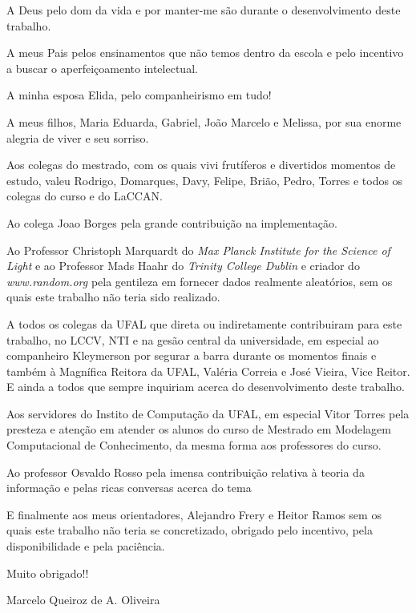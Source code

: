 \documentclass[tcc]{ic}
\begin{document}
\begin{agradecimentos}
\noindent

A Deus pelo dom da vida e por manter-me são durante o desenvolvimento deste trabalho.

A meus Pais pelos ensinamentos que não temos dentro da escola e pelo incentivo a buscar o aperfeiçoamento intelectual.

A minha esposa Elida, pelo companheirismo em tudo!

A meus filhos, Maria Eduarda, Gabriel, João Marcelo e Melissa, por sua enorme alegria de viver e seu sorriso.

Aos colegas do mestrado, com os quais vivi frutíferos e divertidos momentos de estudo, valeu Rodrigo, Domarques, Davy, 
Felipe, Brião, Pedro, Torres e todos os colegas do curso e do LaCCAN.

Ao colega Joao Borges pela grande contribuição na implementação.

Ao Professor Christoph Marquardt do \textit{Max Planck Institute for the Science of Light} e ao Professor Mads Haahr do \textit{Trinity College Dublin} e criador do \textit{www.random.org} pela gentileza em fornecer dados realmente aleatórios, sem os quais este trabalho não teria sido realizado.

A todos os colegas da UFAL que direta ou indiretamente contribuiram para este trabalho, no LCCV, NTI e na gesão central da universidade, em especial ao companheiro Kleymerson por segurar a barra durante os momentos finais e também à Magnífica Reitora da UFAL, Valéria Correia e José Vieira, Vice Reitor. E ainda a todos que sempre inquiriam acerca do desenvolvimento deste trabalho.

Aos servidores do Instito de Computação da UFAL, em especial Vitor Torres pela presteza e atenção em atender os alunos do curso de Mestrado em Modelagem Computacional de Conhecimento, da mesma forma aos professores do curso.

Ao professor Osvaldo Rosso pela imensa contribuição relativa à teoria da informação e pelas ricas conversas acerca do tema

E finalmente aos meus orientadores, Alejandro Frery e Heitor Ramos sem os quais este trabalho não teria se concretizado, obrigado pelo incentivo, pela disponibilidade e pela paciência. 

Muito obrigado!!

\vspace{1em}
\begin{flushright}
Marcelo Queiroz de A. Oliveira
\end{flushright}
\end{agradecimentos}
\end{document}

